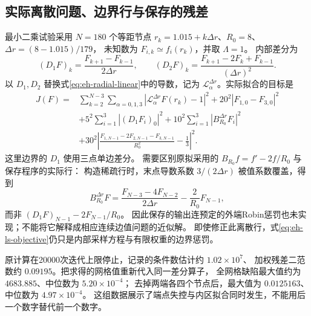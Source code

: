 \documentclass[UTF8,a4paper,11pt,fontset=fandol]{ctexart}
\numberwithin{equation}{section}
\theoremstyle{definition}
\begin{document}
\subsection{实际离散问题、边界行与保存的残差}
最小二乘试验采用 $N=180$ 个等距节点
$r_k=1.015+k\Delta r$、$R_0=8$、$\Delta r=(8-1.015)/179$，
未知数为 $F_{i,k}\simeq f_i(r_k)$，并取 $\Lambda=1$。
内部差分为
\[
(D_1F)_k=\frac{F_{k+1}-F_{k-1}}{2\Delta r},\qquad
(D_2F)_k=\frac{F_{k+1}-2F_k+F_{k-1}}{(\Delta r)^2}.
\]
以 $D_1,D_2$ 替换式\eqref{eq:eh-radial-linear}中的导数，记为
$\mathscr L_\alpha^{\Delta r}$。实际拟合的目标是
\begin{align}
J(F)={}&\sum_{k=2}^{N-3}\sum_{\alpha=0,1,3}
|\mathscr L_\alpha^{\Delta r}F(r_k)-1|^2
+20^2|F_{1,0}-F_{3,0}|^2\nonumber\\
&+5^2\sum_{i=1}^3|(D_1F_i)_0|^2
+10^2\sum_{i=1}^3|B_{R_0}^{\Delta r}F_i|^2\label{eq:eh-ls-objective}\\
&+30^2\left|\frac{F_{1,N-1}-2F_{2,N-1}-F_{3,N-1}}{R_0^2}
-\frac13\right|^2.\nonumber
\end{align}
这里边界的 $D_1$ 使用三点单边差分。
需要区别原拟采用的 $B_{R_0}f=f'-2f/R_0$ 与保存程序的实际行：
构造稀疏行时，末点导数系数 $3/(2\Delta r)$ 被值系数覆盖，得到
\begin{equation}\label{eq:eh-ls-boundary}
B_{R_0}^{\Delta r}F
=\frac{F_{N-3}-4F_{N-2}}{2\Delta r}-\frac2{R_0}F_{N-1},
\end{equation}
而非 $(D_1F)_{N-1}-2F_{N-1}/R_0$。
因此保存的输出连预定的外端Robin惩罚也未实现；不能将它解释成相应连续边值问题的近似解。
即使修正此离散行，式\eqref{eq:eh-ls-objective}仍只是内部采样方程与有限权重的边界惩罚。

原计算在20000次迭代上限停止，记录的条件数估计约 $1.02\times10^7$、
加权残差二范数约 $0.09195$。把求得的网格值重新代入同一差分算子，
全网格缺陷最大值约为 $4683.885$、中位数为 $5.20\times10^{-4}$；
去掉两端各四个节点后，最大值为 $0.0125163$、中位数为 $4.97\times10^{-4}$。
这组数据展示了端点失控与内区拟合同时发生，不能用后一个数字替代前一个数字。
\end{document}
